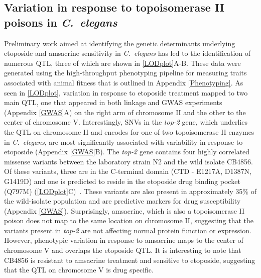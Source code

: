 \documentclass[12pt]{article}
\begin{document}
\subsection{Variation in response to topoisomerase II poisons in {\itshape C.~elegans}}\label{preliminary}

Preliminary work aimed at identifying the genetic determinants underlying etoposide and amsacrine sensitivity in {\it C.~elegans} has led to the identification of numerous QTL, three of which are shown in \autoref{LODplot}A-B. These data were generated using the high-throughput phenotyping pipeline for measuring traits associated with animal fitness that is outlined in Appendix \autoref{Phenotyping}. As seen in \autoref{LODplot}, variation in response to etoposide treatment mapped to two main QTL, one that appeared in both linkage and GWAS experiments (Appendix \autoref{GWAS}A) on the right arm of chromosome II and the other to the center of chromosome V. Interestingly, SNVs in the {\it top-2} gene, which underlies the QTL on chromosome II and encodes for one of two topoisomerase II enzymes in {\it C.~elegans}, are most significantly associated with variability in response to etoposide (Appendix \autoref{GWAS}B). The {\it top-2} gene contains four highly correlated missense variants between the laboratory strain N2 and the wild isolate CB4856. Of these variants, three are in the C-terminal domain (CTD - 	E1217A, D1387N, G1419D) and one is predicted to reside in the etoposide drug binding pocket (Q797M) (\autoref{LODplot}C)~\cite{Sanchez:2011jn}. These variants are also present in approximately 35\% of the wild-isolate population and are predictive markers for drug susceptibility (Appendix \autoref{GWAS}). Surprisingly, amsacrine, which is also a topoisomerase II poison does not map to the same location on chromosome II, suggesting that the variants present in {\it top-2} are not affecting normal protein function or expression. However, phenotypic variation in response to amsacrine maps to the center of chromosome V and overlaps the etoposide QTL. It is interesting to note that CB4856 is resistant to amsacrine treatment and sensitive to etoposide, suggesting that the QTL on chromosome V is drug specific.
\end{document}

